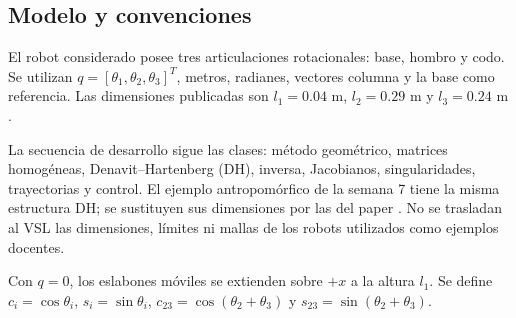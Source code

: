 \subsection{Modelo y convenciones}
El robot considerado posee tres articulaciones rotacionales: base, hombro y codo. Se utilizan $q=[\theta_1,\theta_2,\theta_3]^T$, metros, radianes, vectores columna y la base como referencia. Las dimensiones publicadas son $l_1=0.04$ m, $l_2=0.29$ m y $l_3=0.24$ m \parencite{ramzy2024}.

La secuencia de desarrollo sigue las clases: método geométrico, matrices homogéneas, Denavit--Hartenberg (DH), inversa, Jacobianos, singularidades, trayectorias y control. El ejemplo antropomórfico de la semana 7 tiene la misma estructura DH; se sustituyen sus dimensiones por las del paper \parencite{course7}. No se trasladan al VSL las dimensiones, límites ni mallas de los robots utilizados como ejemplos docentes.

Con $q=0$, los eslabones móviles se extienden sobre $+x$ a la altura $l_1$. Se define $c_i=\cos\theta_i$, $s_i=\sin\theta_i$, $c_{23}=\cos(\theta_2+\theta_3)$ y $s_{23}=\sin(\theta_2+\theta_3)$.
